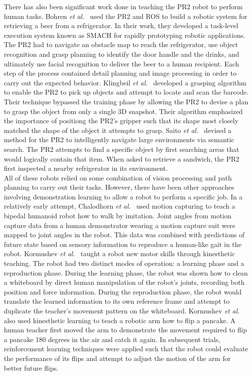 \documentclass{sig-alternate}
\begin{document}
There has also been significant work done in teaching the PR2 robot to perform human tasks. Bohren \textit{et al.}~\cite{beer} used the PR2 and ROS to build a robotic system for retrieving a beer from a refrigerator. In their work, they developed a task-level execution system known as SMACH for rapidly prototyping robotic applications. The PR2 had to navigate an obstacle map to reach the refrigerator, use object recognition and grasp planning to identify the door handle and the drinks, and ultimately use facial recognition to deliver the beer to a human recipient. Each step of the process contained detail planning and image processing in order to carry out the expected behavior. Klingbeil \textit{et al.}~\cite{groceries} developed a grasping algorithm to enable the PR2 to pick up objects and attempt to locate and scan the barcode. Their technique bypassed the training phase by allowing the PR2 to devise a plan to grasp the object from only a single 3D snapshot. Their algorithm emphasized the importance of positiong the PR2's gripper such that its shape most closely matched the shape of the object it attempts to grasp. Saito \textit{et al.}~\cite{subway} devised a method for the PR2 to intelligently navigate large environments via semantic search. The PR2 attempts to find a specific object by first searching areas that would logically contain that item. When asked to retrieve a sandwich, the PR2 first inspected a nearby refrigerator in its environment.\\ 

All of these robots relied on some combination of vision processing and path planning to carry out their tasks. However, there have been other approaches involving demonstration learning to allow a robot to perform a specific job. In a relatively early attempt, Chalodhorn \textit{et al.}~\cite{walk_imitation} used motion capturing to teach a bipedal humanoid robot how to walk by imitation. Joint angles from motion capture data from a human demonstrator wearing a motion capture suit were mapped to joint angles in the robot. This data was combined with predictions of future state based on sensory information to reproduce a human-like gait in the robot. Kormushev \textit{et al.}~\cite{whiteboard} taught a robot new motor skills through kinesthetic teaching. The robot had two distinct modes of operation: a learning phase and a reproduction phase. During the learning phase, the robot was shown how to clean a whiteboard by direct human manipulation of the robot's joints, recording both position and force information. During the reproduction phase, the robot would translate the learned information to its own reference frame and attempt to duplicate the teacher's movement pattern on the whiteboard.  Kormushev \textit{et al.}~\cite{pancakes} also used kinesthetic learning to teach a robotic arm how to flip a pancake. A human teacher first moved the arm to demonstrate the movement required to flip a pancake 180 degrees in the air and catch it again. In subsequent trials, reinforcement learning techniques were applied such that the robot could evaluate the performance of its flips and attempt to adjust the motion of the arm for better future flips.
\end{document}
